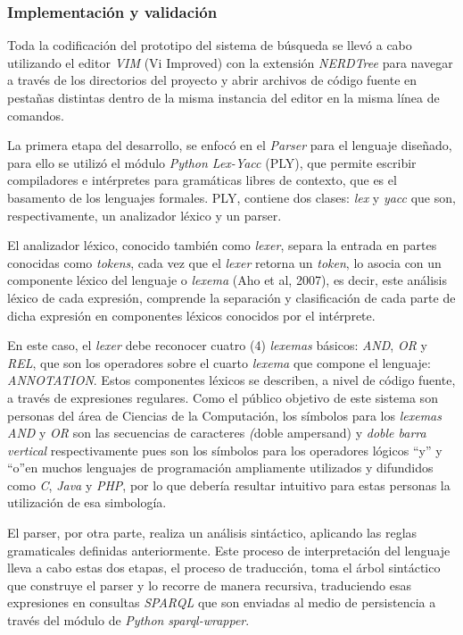 \begin{itemize}
\subsubsection{Implementación y validación}
Toda la codificación del prototipo del sistema de búsqueda se llevó a cabo utilizando el editor \textit{VIM} (Vi Improved) con la extensión \textit{NERDTree} para navegar a través de los directorios del proyecto y abrir archivos de código fuente en pestañas distintas dentro de la misma instancia del editor en la misma línea de comandos.

La primera etapa del desarrollo, se enfocó en el \textit{Parser} para el lenguaje diseñado, para ello se utilizó el módulo \textit{Python Lex-Yacc} (PLY), que permite escribir compiladores e intérpretes para gramáticas libres de contexto, que es el basamento de los lenguajes formales. PLY, contiene dos clases: \textit{lex} y \textit{yacc} que son, respectivamente, un analizador léxico y un parser.

El analizador léxico, conocido también como \textit{lexer}, separa la entrada en partes conocidas como \textit{tokens}, cada vez que el \textit{lexer} retorna un \textit{token}, lo asocia con un componente léxico del lenguaje o \textit{lexema} (Aho et al, 2007), es decir, este análisis léxico de cada expresión, comprende la separación y clasificación de cada parte de dicha expresión en componentes léxicos conocidos por el intérprete.

En este caso, el \textit{lexer} debe reconocer cuatro (4) \textit{lexemas} básicos: \textit{AND}, \textit{OR} y \textit{REL}, que son los operadores sobre el cuarto \textit{lexema} que compone el lenguaje: \textit{ANNOTATION}. Estos componentes léxicos se describen, a nivel de código fuente, a través de expresiones regulares. Como el público objetivo de este sistema son personas del área de Ciencias de la Computación, los símbolos para los \textit{lexemas} \textit{AND} y \textit{OR} son las secuencias de caracteres \textit(doble ampersand) y \textit{doble barra vertical} respectivamente pues son los símbolos para los operadores lógicos ``y'' y ``o''en muchos lenguajes de programación ampliamente utilizados y difundidos como \textit{C}, \textit{Java} y \textit{PHP}, por lo que debería resultar intuitivo para estas personas la utilización de esa simbología.

El parser, por otra parte, realiza un análisis sintáctico, aplicando las reglas gramaticales definidas anteriormente. Este proceso de interpretación del lenguaje lleva a cabo estas dos etapas, el proceso de traducción, toma el árbol sintáctico que construye el parser y lo recorre de manera recursiva, traduciendo esas expresiones en consultas \textit{SPARQL} que son enviadas al medio de persistencia a través del módulo de \textit{Python} \textit{sparql-wrapper}.


\end{itemize}
